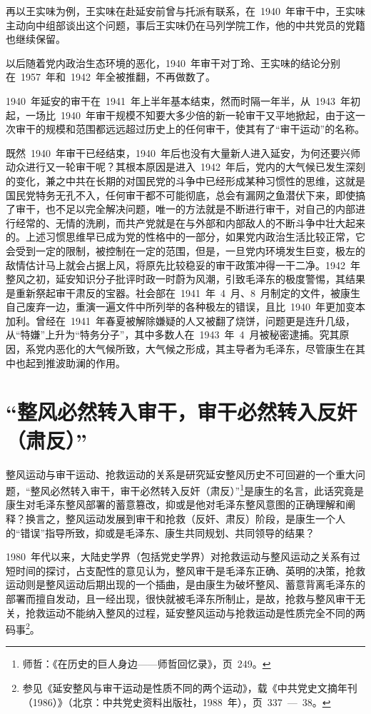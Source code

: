 再以王实味为例，王实味在赴延安前曾与托派有联系，在~1940~年审干中，王实味主动向中组部谈出这个问题，事后王实味仍在马列学院工作，他的中共党员的党籍也继续保留。

以后随着党内政治生态环境的恶化，1940~年审干对丁玲、王实味的结论分别在~1957~年和~1942~年全被推翻，不再做数了。

1940~年延安的审干在~1941~年上半年基本结束，然而时隔一年半，从~1943~年初起，一场比~1940~年审干规模不知要大多少倍的新一轮审干又平地掀起，由于这一次审干的规模和范围都远远超过历史上的任何审干，使其有了“审干运动”的名称。

既然~1940~年审干已经结束，1940~年后也没有大量新人进入延安，为何还要兴师动众进行又一轮审干呢？其根本原因是进入~1942~年后，党内的大气候已发生深刻的变化，兼之中共在长期的对国民党的斗争中已经形成某种习惯性的思维，这就是国民党特务无孔不入，任何审干都不可能彻底，总会有漏网之鱼潜伏下来，即使搞了审干，也不足以完全解决问题，唯一的方法就是不断进行审干，对自己的内部进行经常的、无情的洗刷，而共产党就是在与外部和内部敌人的不断斗争中壮大起来的。上述习惯思维早已成为党的性格中的一部分，如果党内政治生活比较正常，它会受到一定的限制，被控制在一定的范围，但是，一旦党内环境发生巨变，极左的敌情估计马上就会占据上风，将原先比较稳妥的审干政策冲得一干二净。1942~年整风之初，延安知识分子批评时政一时蔚为风潮，引致毛泽东的极度警惕，其结果是重新祭起审干肃反的宝器。社会部在~1941~年~4~月、8~月制定的文件，被康生自己废弃一边，重演一遍文件中所列举的各种极左的错误，且比~1940~年更加变本加利。曾经在~1941~年春夏被解除嫌疑的人又被翻了烧饼，问题更是连升几级，从“特嫌”上升为“特务分子”，其中多数人在~1943~年~4~月被秘密逮捕。究其原因，系党内恶化的大气候所致，大气候之形成，其主导者为毛泽东，尽管康生在其中也起到推波助澜的作用。

\section{“整风必然转入审干，审干必然转入反奸（肃反）”}

整风运动与审干运动、抢救运动的关系是研究延安整风历史不可回避的一个重大问题，“整风必然转入审干，审干必然转入反奸（肃反）”\footnote{师哲：《在历史的巨人身边——师哲回忆录》，页~249。}是康生的名言，此话究竟是康生对毛泽东整风部署的蓄意篡改，抑或是他对毛泽东整风意图的正确理解和阐释？换言之，整风运动发展到审干和抢救（反奸、肃反）阶段，是康生一个人的“错误”指导所致，抑或是毛泽东、康生共同规划、共同领导的结果？

1980~年代以来，大陆史学界（包括党史学界）对抢救运动与整风运动之关系有过短时间的探讨，占支配性的意见认为，整风审干是毛泽东正确、英明的决策，抢救运动则是整风运动后期出现的一个插曲，是由康生为破坏整风、蓄意背离毛泽东的部署而擅自发动，且一经出现，很快就被毛泽东所制止，是故，抢救与整风审干无关，抢救运动不能纳入整风的过程，延安整风运动与抢救运动是性质完全不同的两码事\footnote{参见《延安整风与审干运动是性质不同的两个运动》，载《中共党史文摘年刊（1986）》（北京：中共党史资料出版社，1988~年），页~337~—~38。}。

